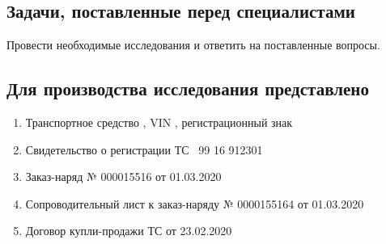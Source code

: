 \subsection{Задачи, поставленные перед специалистами}

Провести необходимые исследования и ответить на поставленные вопросы.

\subsection{Для производства исследования представлено}

\begin{enumerate}
 \item Транспортное средство , VIN \vin, регистрационный знак 
  \item Свидетельство о регистрации ТС \, 99 16 912301
 \item Заказ-наряд № 000015516 от 01.03.2020
 \item Сопроводительный лист к заказ-наряду № 0000155164 от 01.03.2020
 \item Договор купли-продажи ТС от 23.02.2020
\end{enumerate}
%
%

%




